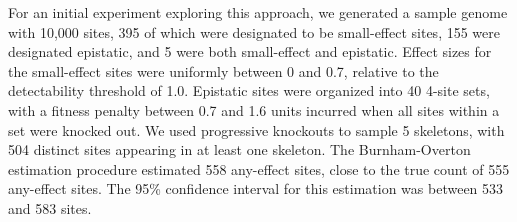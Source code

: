 For an initial experiment exploring this approach, we generated a sample genome with 10,000 sites, 395 of which were designated to be small-effect sites, 155 were designated epistatic, and 5 were both small-effect and epistatic.
Effect sizes for the small-effect sites were uniformly between 0 and 0.7, relative to the detectability threshold of 1.0.
Epistatic sites were organized into 40 4-site sets, with a fitness penalty between 0.7 and 1.6 units incurred when all sites within a set were knocked out.
We used progressive knockouts to sample 5 skeletons, with 504 distinct sites appearing in at least one skeleton.
The Burnham-Overton estimation procedure estimated 558 any-effect sites, close to the true count of 555 any-effect sites.
The 95\% confidence interval for this estimation was between 533 and 583 sites.










